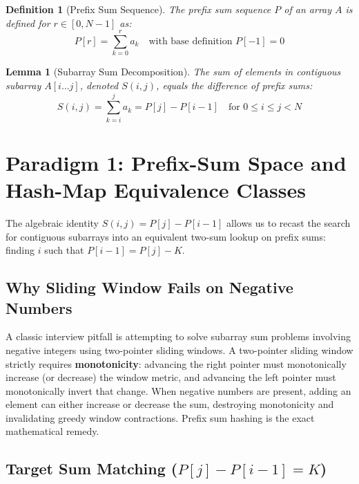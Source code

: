 \documentclass[10pt,journal,compsoc,onecolumn]{IEEEtran}
\newtheorem{lemma}[theorem]{Lemma}
\newtheorem{definition}[theorem]{Definition}
\begin{document}
\begin{definition}[Prefix Sum Sequence]
The prefix sum sequence $P$ of an array $A$ is defined for $r \in [0, N-1]$ as:
\begin{equation}
P[r] = \sum_{k=0}^{r} a_k \quad \text{with base definition } P[-1] = 0
\end{equation}
\end{definition}

\begin{lemma}[Subarray Sum Decomposition]
The sum of elements in contiguous subarray $A[i \dots j]$, denoted $S(i, j)$, equals the difference of prefix sums:
\begin{equation}
S(i, j) = \sum_{k=i}^{j} a_k = P[j] - P[i-1] \quad \text{for } 0 \le i \le j < N
\end{equation}
\end{lemma}

\section{Paradigm 1: Prefix-Sum Space and Hash-Map Equivalence Classes}
\label{sec:prefix-hash}

The algebraic identity $S(i, j) = P[j] - P[i-1]$ allows us to recast the search for contiguous subarrays into an equivalent two-sum lookup on prefix sums: finding $i$ such that $P[i-1] = P[j] - K$.

\subsection{Why Sliding Window Fails on Negative Numbers}
A classic interview pitfall is attempting to solve subarray sum problems involving negative integers using two-pointer sliding windows. A two-pointer sliding window strictly requires \textbf{monotonicity}: advancing the right pointer must monotonically increase (or decrease) the window metric, and advancing the left pointer must monotonically invert that change. When negative numbers are present, adding an element can either increase or decrease the sum, destroying monotonicity and invalidating greedy window contractions. Prefix sum hashing is the exact mathematical remedy.

\subsection{Target Sum Matching ($P[j] - P[i-1] = K$)}
\end{document}
